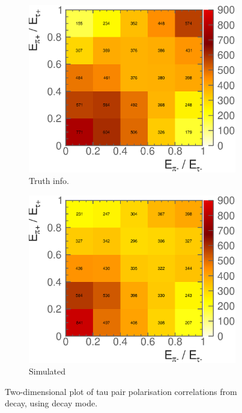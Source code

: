 \begin{figure}[htbp]
\centering %
\begin{subfigure}[b]{0.45\textwidth}
  \includegraphics[width=\textwidth]{tau/NoTimeAnalysis/2DMC}
  \caption{Truth info.}
  \label{fig:TauSpin2DMC}
\end{subfigure}
\begin{subfigure}[b]{0.45\textwidth}
  \includegraphics[width=\textwidth]{tau/NoTimeAnalysis/2Dreco}
  \caption{Simulated}
  \label{fig:TauSpin2Dreco}
\end{subfigure}
\caption
{Two-dimensional plot of tau pair polarisation correlations from \PZ decay, using \tauToPion decay mode.}
\label{fig:TauSpin2D}
\end{figure}
